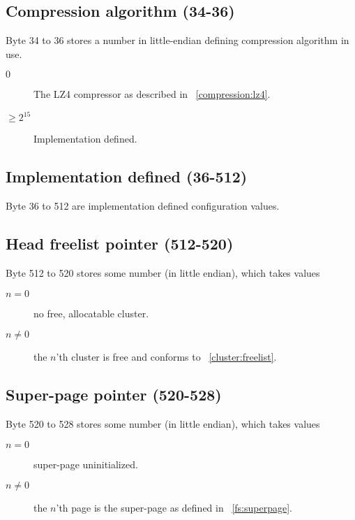 \documentclass[11pt,a4paper]{report}
\begin{document}
        \subsection{Compression algorithm (34-36)}
        \label{config:compression}
        Byte 34 to 36 stores a number in little-endian defining compression
        algorithm in use.

        \begin{description}
            \item [$0$] The LZ4 compressor as described in
                ~\ref{compression:lz4}.
            \item [$\geq 2^{15}$] Implementation defined.
        \end{description}

        \subsection{Implementation defined (36-512)}
        Byte 36 to 512 are implementation defined configuration values.

        \subsection{Head freelist pointer (512-520)}
        Byte 512 to 520 stores some number (in little endian), which takes
        values

        \begin{description}
            \item [$n = 0$]    no free, allocatable cluster.
            \item [$n \neq 0$] the $n$'th cluster is free and conforms to
                ~\ref{cluster:freelist}.
        \end{description}

        \subsection{Super-page pointer (520-528)}
        Byte 520 to 528 stores some number (in little endian), which takes
        values

        \begin{description}
            \item [$n = 0$]    super-page uninitialized.
            \item [$n \neq 0$] the $n$'th page is the super-page as defined in
                ~\ref{fs:superpage}.
        \end{description}
\end{document}
